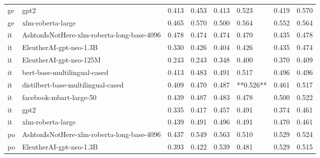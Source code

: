 \begin{tabular}{llllllll}
      ge &                                       gpt2 & 0.413 &                     0.453 &                 0.413 &                  0.523 &                                   0.419 &     0.570 \\
      ge &                          xlm-roberta-large & 0.465 &                     0.570 &                 0.500 &                  0.564 &                                   0.552 &     0.564 \\
      it & AshtonIsNotHere-xlm-roberta-long-base-4096 & 0.478 &                     0.474 &                 0.474 &                  0.470 &                                   0.435 &     0.478 \\
      it &                    EleutherAI-gpt-neo-1.3B & 0.330 &                     0.426 &                 0.404 &                  0.426 &                                   0.435 &     0.474 \\
      it &                    EleutherAI-gpt-neo-125M & 0.243 &                     0.243 &                 0.348 &                  0.400 &                                   0.370 &     0.409 \\
      it &               bert-base-multilingual-cased & 0.413 &                     0.483 &                 0.491 &                  0.517 &                                   0.496 &     0.496 \\
      it &         distilbert-base-multilingual-cased & 0.409 &                     0.470 &                 0.487 &              **0.526** &                                   0.461 &     0.517 \\
      it &                    facebook-mbart-large-50 & 0.439 &                     0.487 &                 0.483 &                  0.478 &                                   0.500 &     0.522 \\
      it &                                       gpt2 & 0.335 &                     0.417 &                 0.457 &                  0.491 &                                   0.374 &     0.461 \\
      it &                          xlm-roberta-large & 0.439 &                     0.491 &                 0.496 &                  0.491 &                                   0.470 &     0.461 \\
      po & AshtonIsNotHere-xlm-roberta-long-base-4096 & 0.437 &                     0.549 &                 0.563 &                  0.510 &                                   0.529 &     0.524 \\
      po &                    EleutherAI-gpt-neo-1.3B & 0.393 &                     0.422 &                 0.539 &                  0.481 &                                   0.529 &     0.515 \\

\end{tabular}

